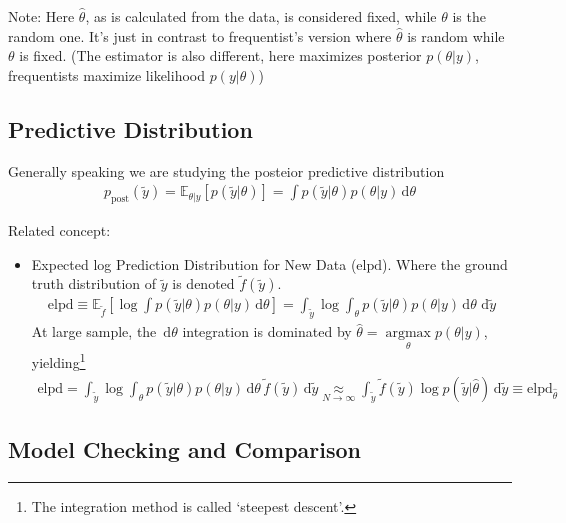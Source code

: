 Note: Here $ \hat{\theta } $, as is calculated from the data, is considered fixed, while $ \theta  $ is the random one. It's just in contrast to frequentist's version where $ \hat{\theta } $ is random while $ \theta  $ is fixed. (The estimator is also different, here maximizes posterior $ p(\theta |y) $, frequentists maximize likelihood $ p(y|\theta ) $)





\subsection{Predictive Distribution}
Generally speaking we are studying the posteior predictive distribution
\begin{align*}
    p_\mathrm{ \text{post} }(\tilde{y})=\mathbb{E}_{\theta |y} \left[ p(\tilde{y}|\theta ) \right]  =\int   p(\tilde{y}|\theta )p(\theta |y)\,\mathrm{d}\theta  
\end{align*}

Related concept:
\begin{itemize}[topsep=2pt,itemsep=0pt]
    \item Expected log Prediction Distribution for New Data ($ \mathrm{ elpd }  $). Where the ground truth distribution of $ \tilde{y} $ is denoted $ \tilde{f}(\tilde{y}) $.
    \begin{align*}
        \mathrm{ elpd } \equiv \mathbb{E}_{\tilde{f}}\left[ \log \int   p(\tilde{y}|\theta )p(\theta |y)\,\mathrm{d}\theta   \right]= \int_{\tilde{y}} \log \int_\theta    p(\tilde{y}|\theta )p(\theta |y)\,\mathrm{d}\theta\,\,\mathrm{d}\tilde{y}
    \end{align*}
    At large sample, the $ \,\mathrm{d}\theta  $ integration is dominated by $ \hat{\theta }=\mathop{ \arg\max }\limits_{\theta }p(\theta |y) $, yielding\footnote{The integration method is called `steepest descent'.}
    \begin{align*}
        \mathrm{ elpd }= \int_{\tilde{y}} \log \int_\theta    p(\tilde{y}|\theta )p(\theta |y)\,\mathrm{d}\theta\, \tilde{f}(\tilde{y})\,\mathrm{d}\tilde{y}\mathop{ \approx }\limits_{N\to\infty}  \int_{\tilde{y}} \tilde{f}(\tilde{y})\log p(\tilde{y}|\hat{\theta } )\,\mathrm{d}\tilde{y}\equiv \mathrm{ elpd }_{\hat{\theta }} 
    \end{align*}
    
    
    
\end{itemize}


\subsection{Model Checking and Comparison}

